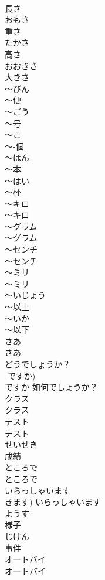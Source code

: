 \documentclass[8pt]{extreport}
\begin{document}
\begin{CJK}{UTF8}{min}
\\	長さ		
\\	おもさ	
\\	重さ		
\\	たかさ	
\\	高さ	
\\	おおきさ	
\\	大きさ		
\\	〜びん	
\\	〜便		
\\	〜ごう	
\\	〜号		
\\	〜こ	
\\	〜-個		
\\	〜ほん	
\\	〜本		
\\	〜はい	
\\	〜杯		
\\	〜キロ	
\\	〜キロ		
\\	〜グラム	
\\	〜グラム		
\\	〜センチ	
\\	〜センチ		
\\	〜ミリ	
\\	〜ミリ		
\\	〜いじょう	
\\	〜以上	
\\	〜いか	
\\	〜以下	
\\	さあ	
\\	さあ		
\\	どうでしょうか？	
\\	-ですか) 
\\	ですか	如何でしょうか？		
\\	クラス	
\\	クラス		
\\	テスト	
\\	テスト		
\\	せいせき	
\\	成績		
\\	ところで	
\\	ところで		
\\	いらっしゃいます	
\\	きます)	いらっしゃいます		
\\	ようす	
\\	様子		
\\	じけん	
\\	事件		
\\	オートバイ	
\\	オートバイ		

\end{CJK}
\end{document}

